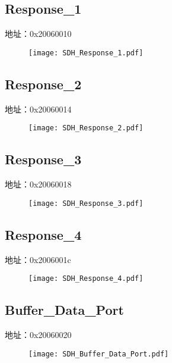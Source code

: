 \subsection{Response\_1}
\label{SDH-Response-1}
地址：0x20060010
 \begin{figure}[H]
\texttt{[image: SDH\_Response\_1.pdf]}
\end{figure}

\subsection{Response\_2}
\label{SDH-Response-2}
地址：0x20060014
 \begin{figure}[H]
\texttt{[image: SDH\_Response\_2.pdf]}
\end{figure}

\subsection{Response\_3}
\label{SDH-Response-3}
地址：0x20060018
 \begin{figure}[H]
\texttt{[image: SDH\_Response\_3.pdf]}
\end{figure}

\subsection{Response\_4}
\label{SDH-Response-4}
地址：0x2006001c
 \begin{figure}[H]
\texttt{[image: SDH\_Response\_4.pdf]}
\end{figure}

\subsection{Buffer\_Data\_Port}
\label{SDH-Buffer-Data-Port}
地址：0x20060020
 \begin{figure}[H]
\texttt{[image: SDH\_Buffer\_Data\_Port.pdf]}
\end{figure}

